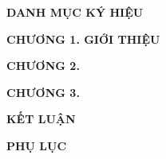 \documentclass[12pt,a4paper]{report}
\begin{document}
\vspace{0.8cm}


\newpage

\begin{center}
    {\fontsize{13}{16}\selectfont\bfseries DANH MỤC KÝ HIỆU}
\end{center}

\vspace{0.8cm}


\newpage

{\fontsize{13}{16}\selectfont\bfseries CHƯƠNG 1. GIỚI THIỆU}

\vspace{0.8cm}


\vspace{0.3cm}

{\fontsize{13}{16}\selectfont\bfseries CHƯƠNG 2.}

\vspace{0.8cm}


\vspace{0.3cm}

{\fontsize{13}{16}\selectfont\bfseries CHƯƠNG 3.}

\vspace{0.8cm}


\newpage

\begin{center}
    {\fontsize{13}{16}\selectfont\bfseries KẾT LUẬN}
\end{center}

\vspace{0.8cm}


\newpage

\begin{center}
    {\fontsize{13}{16}\selectfont\bfseries PHỤ LỤC}
\end{center}
\end{document}
